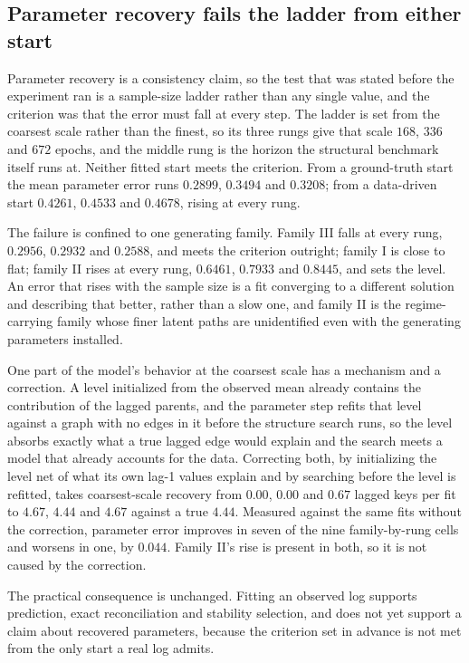 \subsection{Parameter recovery fails the ladder from either start}
\label{sec:lim_params}

Parameter recovery is a consistency claim, so the test that was stated before
the experiment ran is a sample-size ladder rather than any single value, and the
criterion was that the error must fall at every step. The ladder is set from the
coarsest scale rather than the finest, so its three rungs give that scale $168$,
$336$ and $672$ epochs, and the middle rung is the horizon the structural
benchmark itself runs at. Neither fitted start meets the criterion. From a
ground-truth start the mean parameter error runs $0.2899$, $0.3494$ and
$0.3208$; from a data-driven start $0.4261$, $0.4533$ and $0.4678$, rising at
every rung.

The failure is confined to one generating family. Family III falls at every
rung, $0.2956$, $0.2932$ and $0.2588$, and meets the criterion outright; family
I is close to flat; family II rises at every rung, $0.6461$, $0.7933$ and
$0.8445$, and sets the level. An error that rises with the sample size is a fit
converging to a different solution and describing that better, rather than a
slow one, and family II is the regime-carrying family whose finer latent paths
are unidentified even with the generating parameters installed.

One part of the model's behavior at the coarsest scale has a mechanism and a
correction. A level initialized from the observed mean already contains the
contribution of the lagged parents, and the parameter step refits that level
against a graph with no edges in it before the structure search runs, so the
level absorbs exactly what a true lagged edge would explain and the search meets
a model that already accounts for the data. Correcting both, by initializing the
level net of what its own lag-1 values explain and by searching before the level
is refitted, takes coarsest-scale recovery from $0.00$, $0.00$ and $0.67$ lagged
keys per fit to $4.67$, $4.44$ and $4.67$ against a true $4.44$. Measured against
the same fits without the correction, parameter error improves in seven of the
nine family-by-rung cells and worsens in one, by $0.044$. Family II's rise is
present in both, so it is not caused by the correction.

The practical consequence is unchanged. Fitting an observed log supports
prediction, exact reconciliation and stability selection, and does not yet
support a claim about recovered parameters, because the criterion set in advance
is not met from the only start a real log admits.

